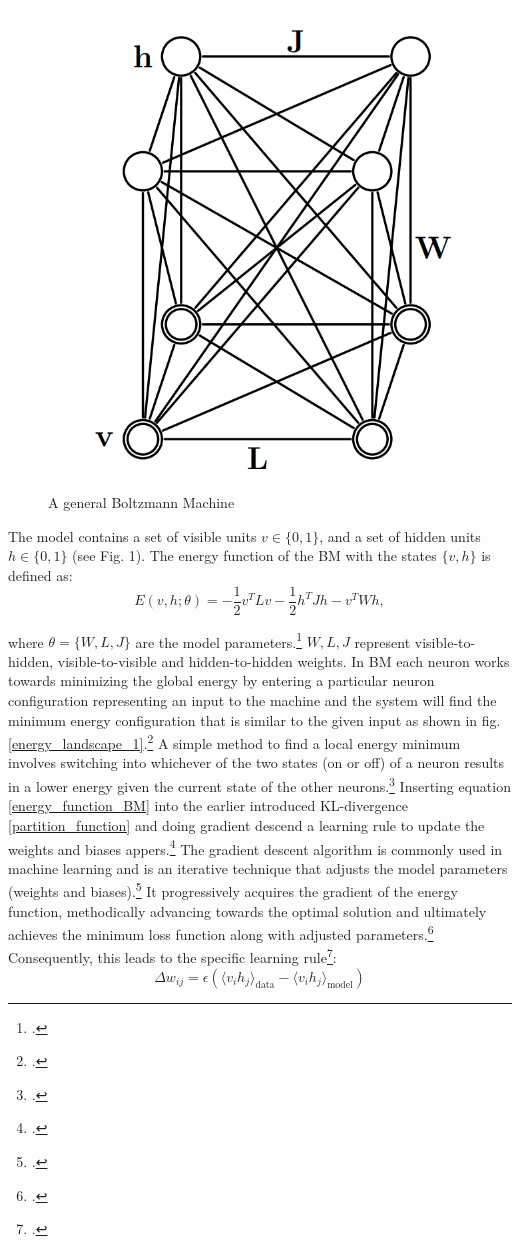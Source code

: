 \begin{figure}[H]
    \centering
    \includegraphics[width=0.25\linewidth]{graphics/General_BM.png}
    \caption{A general Boltzmann Machine}
    \label{fig1}
\end{figure}
The model contains a set of visible units \( v \in \{0, 1\} \), and a set of hidden units \( h \in \{0, 1\} \) (see Fig. 1). The energy function of the \ac{BM} with the states \( \{v, h\} \) is defined as:
\begin{equation}
E(v, h; \theta) = -\frac{1}{2} v^T L v - \frac{1}{2} h^T J h - v^T W h,
\label{energy_function_BM}
\end{equation}

where \( \theta = \{W, L, J\} \) are the model parameters.\footcite[cf.][448]{salakhutdinovDeepBoltzmannMachines2009}
\( W, L, J \) represent visible-to-hidden, visible-to-visible and hidden-to-hidden weights.
In \ac{BM} each neuron works towards minimizing the global energy by 
entering a particular neuron configuration representing an input to the machine and the system will find the minimum energy configuration that is similar to the given input as shown in fig.\ref{energy_landscape_1}.\footcite[cf.][150]{ackleyLearningAlgorithmBoltzmann1985}
A simple method to find a local energy minimum involves switching into whichever of the two states (on or off) of a neuron results in a lower energy given the current state of the other neurons.\footcite[cf.][110]{fahlmanMassivelyParallelArchitectures1983}    
Inserting equation \eqref{energy_function_BM} into the earlier introduced KL-divergence \eqref{partition_function} and doing gradient descend a learning rule to update the weights and biases appers.\footcite[cf.][5]{hintonPracticalGuideTraining2012}
The gradient descent algorithm is commonly used in machine learning and is an iterative technique that adjusts the model parameters (weights and biases).\footcite[cf.][11]{wangResearchApplicationGradient2021}
It progressively acquires the gradient of the energy function, methodically advancing towards the optimal solution and ultimately achieves the minimum loss function along with adjusted parameters.\footcite[cf.][11]{wangResearchApplicationGradient2021}
Consequently, this leads to the specific learning rule\footcite[cf.][5]{hintonPracticalGuideTraining2012}:
\begin{equation}
    \Delta w_{ij} = \epsilon ( \langle v_i h_j \rangle_{\text{data}} - \langle v_i h_j \rangle_{\text{model}} )
    \label{Update_weights}
\end{equation}

